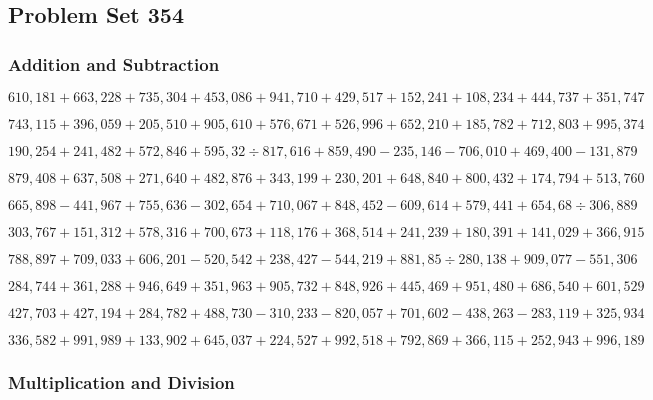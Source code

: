\hypertarget{problem-set-354}{%
\subsection{Problem Set 354}\label{problem-set-354}}

\hypertarget{addition-and-subtraction}{%
\subsubsection{Addition and
Subtraction}\label{addition-and-subtraction}}

\(610,181+663,228+735,304+453,086+941,710+429,517+152,241+108,234+444,737+351,747\)

\(743,115+396,059+205,510+905,610+576,671+526,996+652,210+185,782+712,803+995,374\)

\(190,254+241,482+572,846+595,32÷817,616+859,490-235,146-706,010+469,400-131,879\)

\(879,408+637,508+271,640+482,876+343,199+230,201+648,840+800,432+174,794+513,760\)

\(665,898-441,967+755,636-302,654+710,067+848,452-609,614+579,441+654,68÷306,889\)

\(303,767+151,312+578,316+700,673+118,176+368,514+241,239+180,391+141,029+366,915\)

\(788,897+709,033+606,201-520,542+238,427-544,219+881,85÷280,138+909,077-551,306\)

\(284,744+361,288+946,649+351,963+905,732+848,926+445,469+951,480+686,540+601,529\)

\(427,703+427,194+284,782+488,730-310,233-820,057+701,602-438,263-283,119+325,934\)

\(336,582+991,989+133,902+645,037+224,527+992,518+792,869+366,115+252,943+996,189\)

\hypertarget{multiplication-and-division}{%
\subsubsection{Multiplication and
Division}\label{multiplication-and-division}}

